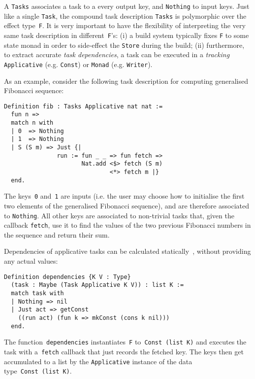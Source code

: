 \documentclass[sigplan,review]{acmart}\settopmatter{printfolios=true,printccs=false,printacmref=false}
\newcommand{\hs}{\texttt}
\newcommand{\coq}{\texttt}
\begin{document}
A \hs{Tasks} associates a task to a every output key, and \hs{Nothing} to input
keys. Just like a single \hs{Task}, the compound task description \hs{Tasks} is
polymorphic over the effect type~\hs{F}. It is very important to have the
flexibility of interpreting the very same task description in
different~\hs{F}'s: (i) a build system typically fixes \hs{F} to some state
monad in order to side-effect the \hs{Store} during the build; (ii) furthermore,
to extract accurate \emph{task dependencies}, a task can be executed in a
\emph{tracking} \hs{Applicative} (e.g. \hs{Const}) or \hs{Monad}
(e.g. \hs{Writer}).

As an example, consider the following task description for computing generalised
Fibonacci sequence:

\vspace{-1mm}
\begin{verbatim}
Definition fib : Tasks Applicative nat nat :=
  fun n =>
  match n with
  | 0  => Nothing
  | 1  => Nothing
  | S (S m) => Just {|
               run := fun _ _ => fun fetch =>
                      Nat.add <$> fetch (S m)
                              <*> fetch m |}
  end.
\end{verbatim}
\vspace{-1mm}

\noindent
The keys~\coq{0} and~\coq{1} are inputs (i.e. the user may choose
how to initialise the first two elements of the generalised Fibonacci sequence),
and are therefore associated to \hs{Nothing}. All other keys are associated to
non-trivial tasks that, given the callback \hs{fetch}, use it to find the values
of the two previous Fibonacci numbers in the sequence and return their sum.

\noindent
Dependencies of applicative tasks can be calculated
statically~\cite{free-applicatives}, without providing any actual values:

\vspace{-1mm}
\begin{verbatim}
Definition dependencies {K V : Type}
  (task : Maybe (Task Applicative K V)) : list K :=
  match task with
  | Nothing => nil
  | Just act => getConst
    ((run act) (fun k => mkConst (cons k nil)))
  end.
\end{verbatim}
\vspace{-1mm}

\noindent
The function~\hs{dependencies} instantiates~\hs{F}
to~\hs{Const}~\hs{(}\hs{list}~\hs{K)} and executes the task with a~\hs{fetch}
callback that just records the fetched key. The keys then get accumulated to a
list by the \hs{Applicative} instance of the data
type~\hs{Const}~\hs{(}\hs{list}~\hs{K)}.
\end{document}
